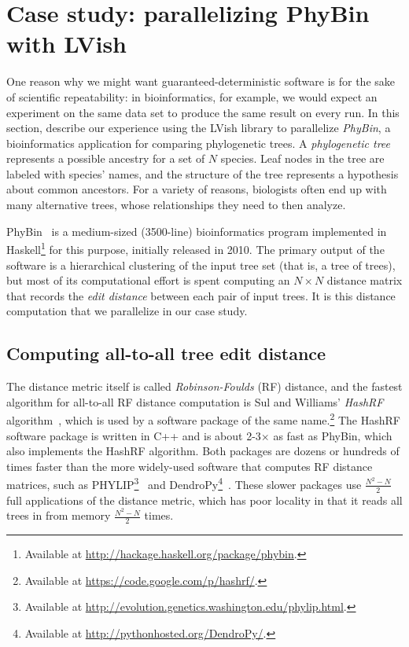 \section{Case study: parallelizing PhyBin with LVish}\label{s:lvish-phybin}

One reason why we might want guaranteed-deterministic software is for
the sake of scientific repeatability: in bioinformatics, for example,
we would expect an experiment on the same data set to produce the same
result on every run.  In this section,  describe our experience using
the LVish library to parallelize \emph{PhyBin}, a bioinformatics
application for comparing phylogenetic trees.  A \emph{phylogenetic
  tree} represents a possible ancestry for a set of $N$ species.  Leaf
nodes in the tree are labeled with species' names, and the structure
of the tree represents a hypothesis about common ancestors. For a
variety of reasons, biologists often end up with many alternative
trees, whose relationships they need to then analyze.

PhyBin~\cite{PhyBin} is a medium-sized (3500-line) bioinformatics
program implemented in Haskell\footnote{Available at
  \url{http://hackage.haskell.org/package/phybin}.} for this purpose,
initially released in 2010.  The primary output of the software is a
hierarchical clustering of the input tree set (that is, a tree of
trees), but most of its computational effort is spent computing an $N
\times N$ distance matrix that records the \emph{edit distance}
between each pair of input trees.  It is this distance computation
that we parallelize in our case study.

\subsection{Computing all-to-all tree edit distance}

The distance metric itself is called \emph{Robinson-Foulds} (RF)
distance, and the fastest algorithm for all-to-all RF distance
computation is Sul and Williams' \emph{HashRF}
algorithm~\cite{hashrf}, which is used by a software package of the
same name.\footnote{Available at
  \url{https://code.google.com/p/hashrf/}.}  The HashRF software
package is written in C++ and is about 2-3$\times$ as fast as PhyBin,
which also implements the HashRF algorithm.  Both packages are dozens
or hundreds of times faster than the more widely-used software that
computes RF distance matrices, such as PHYLIP\footnote{Available at
  \url{http://evolution.genetics.washington.edu/phylip.html}.}~\cite{phylip}
and DendroPy\footnote{Available at
  \url{http://pythonhosted.org/DendroPy/}.}~\cite{dendropy}.  These
slower packages use $\frac{N^2-N}{2}$ full applications of the
distance metric, which has poor locality in that it reads all trees in
from memory $\frac{N^2-N}{2}$ times.

